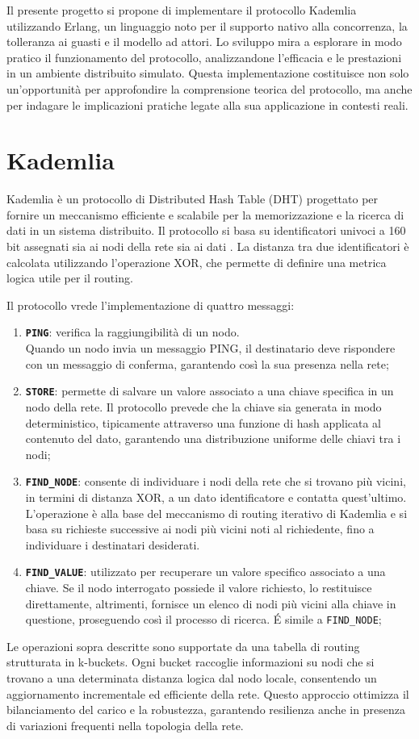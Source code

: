 \documentclass{article}
\begin{document}
Il presente progetto si propone di implementare il protocollo Kademlia utilizzando Erlang, un linguaggio noto per il supporto nativo alla concorrenza, la tolleranza ai guasti e il modello ad attori. Lo sviluppo mira a esplorare in modo pratico il funzionamento del protocollo, analizzandone l'efficacia e le prestazioni in un ambiente distribuito simulato. Questa implementazione costituisce non solo un'opportunità per approfondire la comprensione teorica del protocollo, ma anche per indagare le implicazioni pratiche legate alla sua applicazione in contesti reali.

\section{Kademlia}
Kademlia è un protocollo di Distributed Hash Table (DHT) progettato per fornire un meccanismo efficiente e scalabile per la memorizzazione e la ricerca di dati in un sistema distribuito. Il protocollo si basa su identificatori univoci a 160 bit assegnati sia ai nodi della rete sia ai dati \cite{kad}. La distanza tra due identificatori è calcolata utilizzando l'operazione XOR, che permette di definire una metrica logica utile per il routing.

Il protocollo vrede l'implementazione di quattro messaggi:
\begin{enumerate}
    \item {\bf \texttt{PING}}: verifica la raggiungibilità di un nodo.\\ Quando un nodo invia un messaggio PING, il destinatario deve rispondere con un messaggio di conferma, garantendo così la sua presenza nella rete;
    \item {\bf \texttt{STORE}}: permette di salvare un valore associato a una chiave specifica in un nodo della rete. Il protocollo prevede che la chiave sia generata in modo deterministico, tipicamente attraverso una funzione di hash applicata al contenuto del dato, garantendo una distribuzione uniforme delle chiavi tra i nodi;
    \item {\bf \texttt{FIND\_NODE}}: consente di individuare i nodi della rete che si trovano più vicini, in termini di distanza XOR, a un dato identificatore e contatta quest'ultimo. L'operazione è alla base del meccanismo di routing iterativo di Kademlia e si basa su richieste successive ai nodi più vicini noti al richiedente, fino a individuare i destinatari desiderati.
    \item {\bf \texttt{FIND\_VALUE}}: utilizzato per recuperare un valore specifico associato a una chiave. Se il nodo interrogato possiede il valore richiesto, lo restituisce direttamente, altrimenti, fornisce un elenco di nodi più vicini alla chiave in questione, proseguendo così il processo di ricerca. \'E simile a \texttt{FIND\_NODE};
\end{enumerate}
Le operazioni sopra descritte sono supportate da una tabella di routing strutturata in k-buckets. Ogni bucket raccoglie informazioni su nodi che si trovano a una determinata distanza logica dal nodo locale, consentendo un aggiornamento incrementale ed efficiente della rete. Questo approccio ottimizza il bilanciamento del carico e la robustezza, garantendo resilienza anche in presenza di variazioni frequenti nella topologia della rete.
\end{document}
